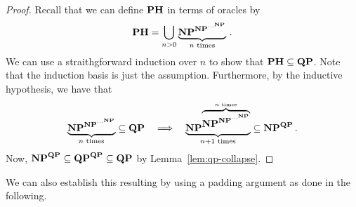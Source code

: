 \documentclass[12pt]{article}
\theoremstyle{definition}
\begin{document}
\begin{proof}
  Recall that we can define $\mathbf{PH}$ in terms of oracles by
  \[
    \mathbf{PH} =
    \bigcup_{n > 0} \underbrace{\mathbf{NP}^{\mathbf{NP}^{\cdots^{\mathbf{NP}}}}}_{n \textrm{ times}}
    \,.
  \]
  We can use a straithgforward induction over $n$ to show that
  $\mathbf{PH} \subseteq \mathbf{QP}$.
  Note that the induction basis is just the assumption.
  Furthermore, by the inductive hypothesis, we have that
  \[
    \underbrace{\mathbf{NP}^{\mathbf{NP}^{\cdots^{\mathbf{NP}}}}}_{n \textrm{ times}}
    \subseteq
    \mathbf{QP}
    \quad
    \Longrightarrow
    \quad
    \underbrace{\mathbf{NP}^{\overbrace{
      \mathbf{NP}^{\mathbf{NP}^{\cdots^{\mathbf{NP}}}}
    }^{n \textrm{ times}}}}_{n+1 \textrm{ times}}
    \subseteq
    \mathbf{NP}^{\mathbf{QP}} \,.
  \]
  Now, $\mathbf{NP}^{\mathbf{QP}} \subseteq \mathbf{QP}^{\mathbf{QP}} \subseteq\mathbf{QP} $
  by Lemma~\ref{lem:qp-collapse}.
\end{proof}

%   
%   

We can also establish this resulting by using a padding argument as done
in the following.
\end{document}
